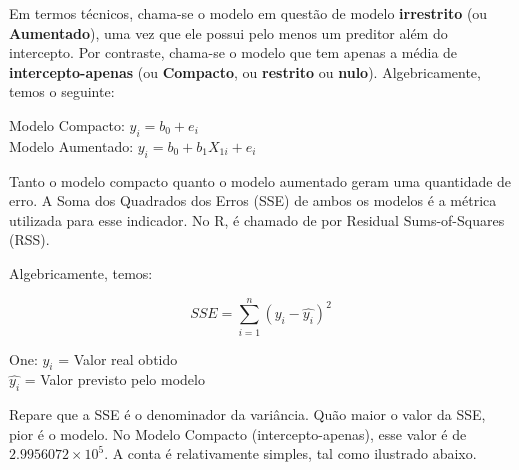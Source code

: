 \documentclass[
]{book}
\newenvironment{Shaded}{\begin{snugshade}}{\end{snugshade}}
\newcommand{\CommentTok}[1]{\textcolor[rgb]{0.56,0.35,0.01}{\textit{#1}}}
\newcommand{\DataTypeTok}[1]{\textcolor[rgb]{0.13,0.29,0.53}{#1}}
\newcommand{\DecValTok}[1]{\textcolor[rgb]{0.00,0.00,0.81}{#1}}
\newcommand{\KeywordTok}[1]{\textcolor[rgb]{0.13,0.29,0.53}{\textbf{#1}}}
\newcommand{\NormalTok}[1]{#1}
\newcommand{\OperatorTok}[1]{\textcolor[rgb]{0.81,0.36,0.00}{\textbf{#1}}}
\newcommand{\StringTok}[1]{\textcolor[rgb]{0.31,0.60,0.02}{#1}}
\begin{document}
Em termos técnicos, chama-se o modelo em questão de modelo \textbf{irrestrito} (ou \textbf{Aumentado}), uma vez que ele possui pelo menos um preditor além do intercepto. Por contraste, chama-se o modelo que tem apenas a média de \textbf{intercepto-apenas} (ou \textbf{Compacto}, ou \textbf{restrito} ou \textbf{nulo}). Algebricamente, temos o seguinte:

Modelo Compacto: \(y_i = b_0 + e_i\)\\
Modelo Aumentado: \(y_i = b_0 + b_1X_{1i} + e_i\)

Tanto o modelo compacto quanto o modelo aumentado geram uma quantidade de erro. A Soma dos Quadrados dos Erros (SSE) de ambos os modelos é a métrica utilizada para esse indicador. No R, é chamado de por Residual Sums-of-Squares (RSS).

Algebricamente, temos:

\[SSE =  \sum_{i=1}^{n}(y_i - \hat{y_i})^2\]

One:
\(y_i\) = Valor real obtido\\
\(\hat{y_i}\) = Valor previsto pelo modelo

Repare que a SSE é o denominador da variância. Quão maior o valor da SSE, pior é o modelo. No Modelo Compacto (intercepto-apenas), esse valor é de \ensuremath{2.9956072\times 10^{5}}. A conta é relativamente simples, tal como ilustrado abaixo.

\begin{Shaded}
\end{Shaded}
\end{document}
